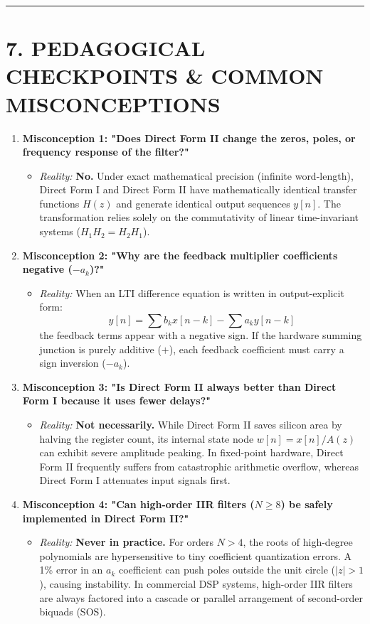 \documentclass[11pt,a4paper]{article}
\begin{document}
\noindent\rule{\textwidth}{0.5pt}

\section{7. PEDAGOGICAL CHECKPOINTS \& COMMON MISCONCEPTIONS}

\begin{enumerate}
    \item \textbf{Misconception 1: "Does Direct Form II change the zeros, poles, or frequency response of the filter?"}
    \begin{itemize}
        \item \textit{Reality:} \textbf{No.} Under exact mathematical precision (infinite word-length), Direct Form I and Direct Form II have mathematically identical transfer functions $H(z)$ and generate identical output sequences $y[n]$. The transformation relies solely on the commutativity of linear time-invariant systems ($H_1 H_2 = H_2 H_1$).
    \end{itemize}

    \item \textbf{Misconception 2: "Why are the feedback multiplier coefficients negative ($-a_k$)?"}
    \begin{itemize}
        \item \textit{Reality:} When an LTI difference equation is written in output-explicit form:
        $$y[n] = \sum b_k x[n-k] - \sum a_k y[n-k]$$
        the feedback terms appear with a negative sign. If the hardware summing junction is purely additive ($+$), each feedback coefficient must carry a sign inversion ($-a_k$).
    \end{itemize}

    \item \textbf{Misconception 3: "Is Direct Form II always better than Direct Form I because it uses fewer delays?"}
    \begin{itemize}
        \item \textit{Reality:} \textbf{Not necessarily.} While Direct Form II saves silicon area by halving the register count, its internal state node $w[n] = x[n] / A(z)$ can exhibit severe amplitude peaking. In fixed-point hardware, Direct Form II frequently suffers from catastrophic arithmetic overflow, whereas Direct Form I attenuates input signals first.
    \end{itemize}

    \item \textbf{Misconception 4: "Can high-order IIR filters ($N \ge 8$) be safely implemented in Direct Form II?"}
    \begin{itemize}
        \item \textit{Reality:} \textbf{Never in practice.} For orders $N > 4$, the roots of high-degree polynomials are hypersensitive to tiny coefficient quantization errors. A 1\% error in an $a_k$ coefficient can push poles outside the unit circle ($|z| > 1$), causing instability. In commercial DSP systems, high-order IIR filters are always factored into a cascade or parallel arrangement of second-order biquads (SOS).
    \end{itemize}
\end{enumerate}
\end{document}
